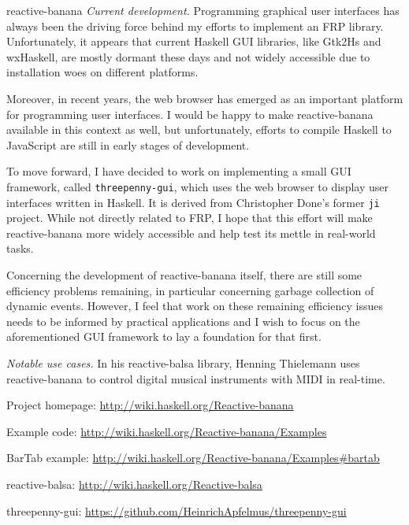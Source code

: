 \begin{hcarentry}[updated]{reactive-banana}
\emph{Current development.}
Programming graphical user interfaces has always been the driving force behind my efforts to implement an FRP library. Unfortunately, it appears that current Haskell GUI libraries, like Gtk2Hs and wxHaskell, are mostly dormant these days and not widely accessible due to installation woes on different platforms.

Moreover, in recent years, the web browser has emerged as an important platform for programming user interfaces. I would be happy to make reactive-banana available in this context as well, but unfortunately, efforts to compile Haskell to JavaScript are still in early stages of development.

To move forward, I have decided to work on implementing a small GUI framework, called \verb!threepenny-gui!, which uses the web browser to display user interfaces written in Haskell. It is derived from Christopher Done's former \verb!ji! project. While not directly related to FRP, I hope that this effort will make reactive-banana more widely accessible and help test its mettle in real-world tasks.

Concerning the development of reactive-banana itself, there are still some efficiency problems remaining, in particular concerning garbage collection of dynamic events. However, I feel that work on these remaining efficiency issues needs to be informed by practical applications and I wish to focus on the aforementioned GUI framework to lay a foundation for that first.

\emph{Notable use cases.} In his reactive-balsa library, Henning Thielemann uses reactive-banana to control digital musical instruments with MIDI in real-time.

\FurtherReading
\begin{compactitem}
\item Project homepage: \url{http://wiki.haskell.org/Reactive-banana}
\item Example code: \url{http://wiki.haskell.org/Reactive-banana/Examples}
\item BarTab example: \url{http://wiki.haskell.org/Reactive-banana/Examples#bartab}
\item reactive-balsa: \url{http://wiki.haskell.org/Reactive-balsa}
\item threepenny-gui: \url{https://github.com/HeinrichApfelmus/threepenny-gui}
\end{compactitem}
\end{hcarentry}
